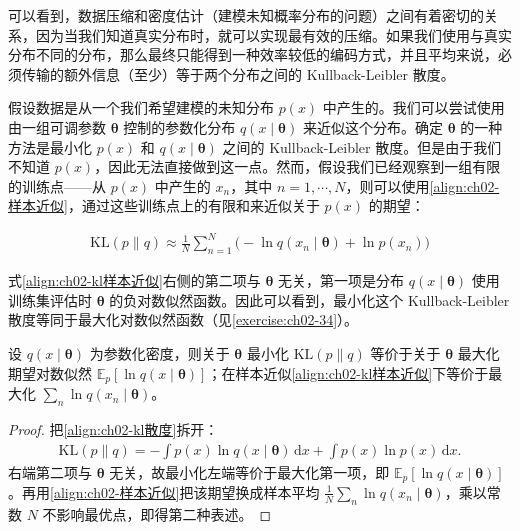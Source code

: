 \documentclass[../../main.tex]{subfiles}
\begin{document}
可以看到，数据压缩和密度估计（建模未知概率分布的问题）之间有着密切的关系，因为当我们知道真实分布时，就可以实现最有效的压缩。如果我们使用与真实分布不同的分布，那么最终只能得到一种效率较低的编码方式，并且平均来说，必须传输的额外信息（至少）等于两个分布之间的 Kullback-Leibler 散度。

假设数据是从一个我们希望建模的未知分布 $p(x)$ 中产生的。我们可以尝试使用由一组可调参数 $\boldsymbol{\theta}$ 控制的参数化分布 $q(x\mid\boldsymbol{\theta})$ 来近似这个分布。确定 $\boldsymbol{\theta}$ 的一种方法是最小化 $p(x)$ 和 $q(x\mid\boldsymbol{\theta})$ 之间的 Kullback-Leibler 散度。但是由于我们不知道 $p(x)$，因此无法直接做到这一点。然而，假设我们已经观察到一组有限的训练点——从 $p(x)$ 中产生的 $x_n$，其中 $n=1,\cdots,N$，则可以使用\eqref{align:ch02-样本近似}，通过这些训练点上的有限和来近似关于 $p(x)$ 的期望：

\begin{align}
  \mathrm{KL}(p\|q) \approx \frac{1}{N}\sum_{n=1}^{N}\big(-\ln q(x_n\mid\boldsymbol{\theta}) + \ln p(x_n)\big)
  \label{align:ch02-kl样本近似}
\end{align}

式\eqref{align:ch02-kl样本近似}右侧的第二项与 $\boldsymbol{\theta}$ 无关，第一项是分布 $q(x\mid\boldsymbol{\theta})$ 使用训练集评估时 $\boldsymbol{\theta}$ 的负对数似然函数。因此可以看到，最小化这个 Kullback-Leibler 散度等同于最大化对数似然函数（见\cref{exercise:ch02-34}）。

\begin{proposition}[KL 散度与对数似然]\label{proposition:ch02-kl与似然}
设 $q(x\mid\boldsymbol{\theta})$ 为参数化密度，则关于 $\boldsymbol{\theta}$ 最小化 $\mathrm{KL}(p\|q)$ 等价于关于 $\boldsymbol{\theta}$ 最大化期望对数似然 $\mathbb{E}_p[\ln q(x\mid\boldsymbol{\theta})]$；在样本近似\eqref{align:ch02-kl样本近似}下等价于最大化 $\sum_n\ln q(x_n\mid\boldsymbol{\theta})$。
\end{proposition}

\begin{proof}
把\eqref{align:ch02-kl散度}拆开：
\begin{align*}
  \mathrm{KL}(p\|q) = -\int p(x)\ln q(x\mid\boldsymbol{\theta})\,\mathrm{d}x + \int p(x)\ln p(x)\,\mathrm{d}x .
\end{align*}
右端第二项与 $\boldsymbol{\theta}$ 无关，故最小化左端等价于最大化第一项，即 $\mathbb{E}_p[\ln q(x\mid\boldsymbol{\theta})]$。再用\eqref{align:ch02-样本近似}把该期望换成样本平均 $\frac{1}{N}\sum_n\ln q(x_n\mid\boldsymbol{\theta})$，乘以常数 $N$ 不影响最优点，即得第二种表述。
\end{proof}
\end{document}
